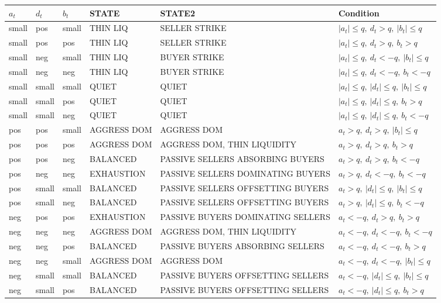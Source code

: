 \documentclass[11pt]{article}
\begin{document}
\begin{center}
\footnotesize
\setlength{\tabcolsep}{3.5pt}
\renewcommand{\arraystretch}{1.12}
\begin{tabular}{@{}lll>{\raggedright\arraybackslash}p{}>{\raggedright\arraybackslash}p{}>{\raggedright\arraybackslash}p{}@{}}
\toprule
$a_t$ & $d_t$ & $b_t$ & STATE & STATE2 & Condition \\
\midrule
small & pos & small & THIN LIQ & SELLER STRIKE & $|a_t|\le q,\ d_t>q,\ |b_t|\le q$ \\
small & pos & pos & THIN LIQ & SELLER STRIKE & $|a_t|\le q,\ d_t>q,\ b_t>q$ \\
small & neg & small & THIN LIQ & BUYER STRIKE & $|a_t|\le q,\ d_t<-q,\ |b_t|\le q$ \\
small & neg & neg & THIN LIQ & BUYER STRIKE & $|a_t|\le q,\ d_t<-q,\ b_t<-q$ \\
small & small & small & QUIET & QUIET & $|a_t|\le q,\ |d_t|\le q,\ |b_t|\le q$ \\
small & small & pos & QUIET & QUIET & $|a_t|\le q,\ |d_t|\le q,\ b_t>q$ \\
small & small & neg & QUIET & QUIET & $|a_t|\le q,\ |d_t|\le q,\ b_t<-q$ \\
pos & pos & small & AGGRESS DOM & AGGRESS DOM & $a_t>q,\ d_t>q,\ |b_t|\le q$ \\
pos & pos & pos & AGGRESS DOM & AGGRESS DOM, THIN LIQUIDITY & $a_t>q,\ d_t>q,\ b_t>q$ \\
pos & pos & neg & BALANCED & PASSIVE SELLERS ABSORBING BUYERS & $a_t>q,\ d_t>q,\ b_t<-q$ \\
pos & neg & neg & EXHAUSTION & PASSIVE SELLERS DOMINATING BUYERS & $a_t>q,\ d_t<-q,\ b_t<-q$ \\
pos & small & small & BALANCED & PASSIVE SELLERS OFFSETTING BUYERS & $a_t>q,\ |d_t|\le q,\ |b_t|\le q$ \\
pos & small & neg & BALANCED & PASSIVE SELLERS OFFSETTING BUYERS & $a_t>q,\ |d_t|\le q,\ b_t<-q$ \\
neg & pos & pos & EXHAUSTION & PASSIVE BUYERS DOMINATING SELLERS & $a_t<-q,\ d_t>q,\ b_t>q$ \\
neg & neg & neg & AGGRESS DOM & AGGRESS DOM, THIN LIQUIDITY & $a_t<-q,\ d_t<-q,\ b_t<-q$ \\
neg & neg & pos & BALANCED & PASSIVE BUYERS ABSORBING SELLERS & $a_t<-q,\ d_t<-q,\ b_t>q$ \\
neg & neg & small & AGGRESS DOM & AGGRESS DOM & $a_t<-q,\ d_t<-q,\ |b_t|\le q$ \\
neg & small & small & BALANCED & PASSIVE BUYERS OFFSETTING SELLERS & $a_t<-q,\ |d_t|\le q,\ |b_t|\le q$ \\
neg & small & pos & BALANCED & PASSIVE BUYERS OFFSETTING SELLERS & $a_t<-q,\ |d_t|\le q,\ b_t>q$ \\
\bottomrule
\end{tabular}
\end{center}
\end{document}

